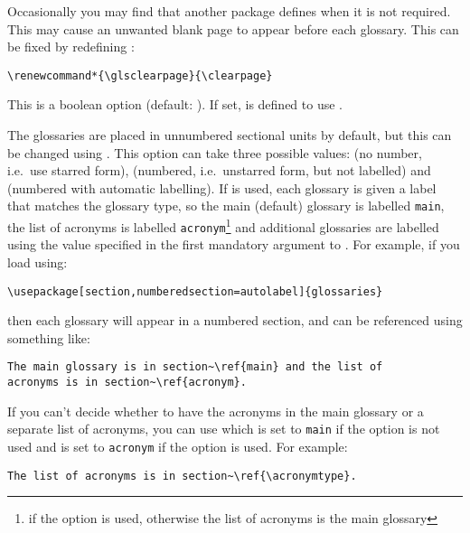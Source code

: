 \documentclass[report]{nlctdoc}
\begin{document}
\begin{description}
Occasionally you may find that another package defines 
\linebreak{} when it is not required. This may cause an 
unwanted blank page to appear before each glossary. This can
be fixed by redefining :
\begin{verbatim}
\renewcommand*{\glsclearpage}{\clearpage}
\end{verbatim}

\item[\pkgopt{ucmark}] This is a boolean option (default: ). If
set,  is defined to use .

\item[\pkgopt{numberedsection}]
The glossaries are placed in unnumbered sectional units by default,
but this can be changed using . This option can take
three possible values:  (no
number, i.e.\ use starred form), 
(numbered, i.e.\ unstarred form, but not labelled) and
 (numbered with automatic
labelling). If  is used, each
glossary is given a label that matches the glossary type, so the
main (default) glossary is labelled \texttt{main}, the list of
acronyms is labelled \texttt{acronym}\footnote{if the
 option is used, otherwise the list of
acronyms is the main glossary} and additional glossaries are labelled
using the value specified in the first mandatory argument to 
. For example, if you load 
using:
\begin{verbatim}
\usepackage[section,numberedsection=autolabel]{glossaries}
\end{verbatim}
then each glossary will appear in a numbered section, and can
be referenced using something like:
\begin{verbatim}
The main glossary is in section~\ref{main} and the list of
acronyms is in section~\ref{acronym}.
\end{verbatim}
If you can't decide whether to have the acronyms in the main
glossary or a separate list of acronyms, you can use
 which is set to \texttt{main} if the
 option is not used and is set to \texttt{acronym}
if the  option is used. For example:
\begin{verbatim}
The list of acronyms is in section~\ref{\acronymtype}.
\end{verbatim}


\end{description}
\end{document}
